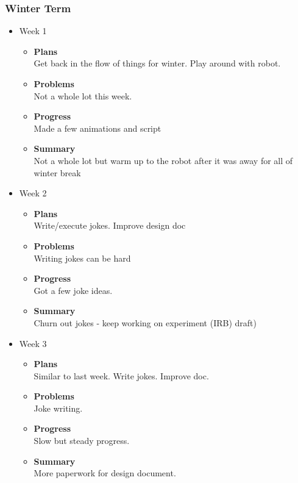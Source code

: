 	\subsubsection{Winter Term}
	\begin{itemize}
		\item{Week 1}
			\begin{itemize}
				\item \textbf{Plans} \\
				Get back in the flow of things for winter. Play around with robot.
				\item \textbf{Problems} \\
				Not a whole lot this week.
				\item \textbf{Progress} \\
				Made a few animations and script
				\item \textbf{Summary} \\
				Not a whole lot but warm up to the robot after it was away for all of winter break
			\end{itemize}
		\item{Week 2}
			\begin{itemize}
				\item \textbf{Plans} \\
				Write/execute jokes. Improve design doc
				\item \textbf{Problems} \\
				Writing jokes can be hard
				\item \textbf{Progress} \\
				Got a few joke ideas.
				\item \textbf{Summary} \\
				Churn out jokes - keep working on experiment (IRB) draft)
			\end{itemize}
		\item{Week 3}
			\begin{itemize}
				\item \textbf{Plans} \\
				Similar to last week. Write jokes. Improve doc.
				\item \textbf{Problems} \\
				Joke writing.
				\item \textbf{Progress} \\
				Slow but steady progress.
				\item \textbf{Summary} \\
				More paperwork for design document.
			\end{itemize}

\end{itemize}

